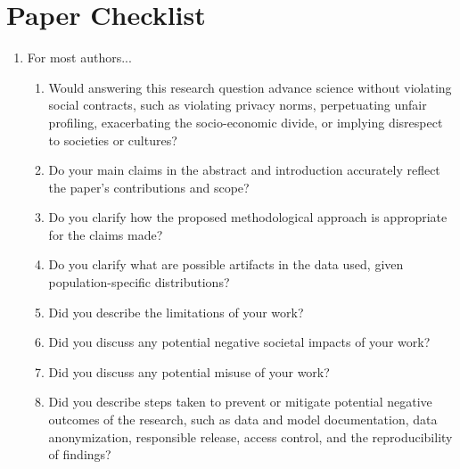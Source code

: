 \documentclass[letterpaper]{article} %
\begin{document}
\section*{Paper Checklist}
\begin{enumerate}

\item For most authors...
\begin{enumerate}
    \item Would answering this research question advance science without violating social contracts, such as violating privacy norms, perpetuating unfair profiling, exacerbating the socio-economic divide, or implying disrespect to societies or cultures?
    

  \item Do your main claims in the abstract and introduction accurately reflect the paper's contributions and scope?
    

  \item Do you clarify how the proposed methodological approach is appropriate for the claims made?
    

  \item Do you clarify what are possible artifacts in the data used, given population-specific distributions?
    

  \item Did you describe the limitations of your work?
    

  \item Did you discuss any potential negative societal impacts of your work?
    

  \item Did you discuss any potential misuse of your work?
    

  \item Did you describe steps taken to prevent or mitigate potential negative outcomes of the research, such as data and model documentation, data anonymization, responsible release, access control, and the reproducibility of findings?
    


\end{enumerate}
\end{enumerate}
\end{document}
